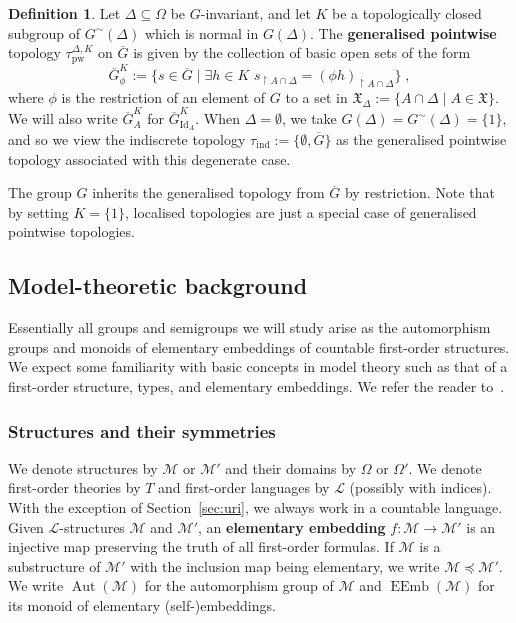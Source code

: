 \documentclass{article}
\theoremstyle{remark}
\theoremstyle{definition}
\newtheorem{definition}[theorem]{Definition}
\DeclareMathOperator{\Aut}{Aut}
\DeclareMathOperator{\EEmb}{EEmb}
\newcommand{\M}[0]{\mathcal{M}}
\newcommand{\pw}[0]{\tau_{\mathrm{pw}}}
\newcommand{\X}[0]{\mathfrak{X}}
\newcommand{\gc}[0]{G^{\sim}}
\begin{document}
{{{{      
  \begin{definition} \label{d:generalized pointwise stabilizer}
    {Let $\Delta\subseteq \Omega$ be $G$-invariant, and let $K$ be a topologically closed subgroup of  $\gc(\Delta)$ which is normal in $G(\Delta)$. %
    The  \textbf{generalised pointwise} topology  $\pw^{\Delta,K}$ on {$\overline{G}$}
    is given by the collection of basic open sets of the form} 
  	\begin{equation}\label{basic neighourhoods}
     \overline{G}_{\phi}^{K}:=\{s\in %
     \overline{G}
     \;|\;\exists h\in K\,\,s_{\restriction A\cap\Delta}=(\phi h)_{\restriction A\cap\Delta}\}\;, 
  	\end{equation}
  	{where $\phi$ is the restriction of an element of $G$ to a set in  $\X_\Delta:=\{A\cap\Delta\;|\; A\in\X\}$.
    We will also write $\overline{G}_{A}^{K}$ for $\overline{G}_{\mathrm{Id}_{A}}^{K}$.} {When $\Delta=\emptyset$, we take $G(\Delta)=\gc(\Delta)=\{1\}$, and so we view the indiscrete topology $\tau_\mathrm{ind}:=\{\emptyset, \overline{G}\}$ as the generalised pointwise topology associated with this degenerate case.}
  \end{definition}
 {The group $G$ inherits the  generalised topology from $\overline{G}$ by restriction.} {Note that by setting $K=\{1\}$,  localised topologies are just a special case of generalised pointwise topologies.}%


 

  





\subsection{Model-theoretic background} 

Essentially all groups and semigroups we will study arise as the automorphism groups and monoids of elementary embeddings of countable first-order structures. We expect some familiarity with basic concepts in model theory such as that of a first-order structure, types, and elementary embeddings. We refer the reader to~\cite[Chapters 1-4]{tent2012course}.

\subsubsection{Structures and their symmetries}  We denote structures by $\M$ or $\M'$ and their domains by $\Omega$ or $\Omega'$. We denote first-order theories by $T$ and first-order languages by $\mathcal{L}$ (possibly with indices).  With the exception of Section~\ref{sec:uri}, we always work in a countable language. Given $\mathcal{L}$-structures $\M$ and $\M'$, an \textbf{elementary embedding} $f:\M\to\M'$ is an injective map preserving the truth of all first-order formulas. If $\M$ is a substructure of $\M'$ with the inclusion map being elementary, we write $\M\preceq \M'$. We write $\Aut(\M)$ for the automorphism group of $\M$ and $\EEmb(\M)$ for its monoid of elementary (self-)embeddings. 




}}}}
\end{document}
